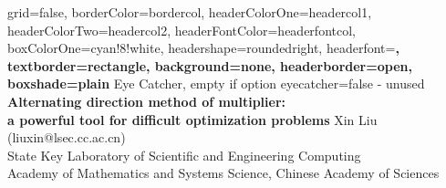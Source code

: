 \documentclass[a0paper,portrait]{baposter}
\begin{document}
\begin{poster}{
	grid=false,
	borderColor=bordercol,
	headerColorOne=headercol1,
	headerColorTwo=headercol2,
	headerFontColor=headerfontcol,
	boxColorOne=cyan!8!white,
	headershape=roundedright,
	headerfont=\Large\sf\bf,
	textborder=rectangle,
	background=none,
	headerborder=open,
    boxshade=plain
}
{
	Eye Catcher, empty if option eyecatcher=false - unused
}
{\sf\bf
	Alternating direction method of multiplier:\\ a powerful tool for difficult optimization problems
}
{
	\vspace{1mm} {\smaller Xin Liu (liuxin@lsec.cc.ac.cn)\\  State Key Laboratory of Scientific and Engineering Computing\\
Academy of Mathematics and Systems Science,
Chinese Academy of Sciences}
}
{
\setlength\fboxsep{0pt}
\setlength\fboxrule{0.5pt}
}


\end{poster}
\end{document}
